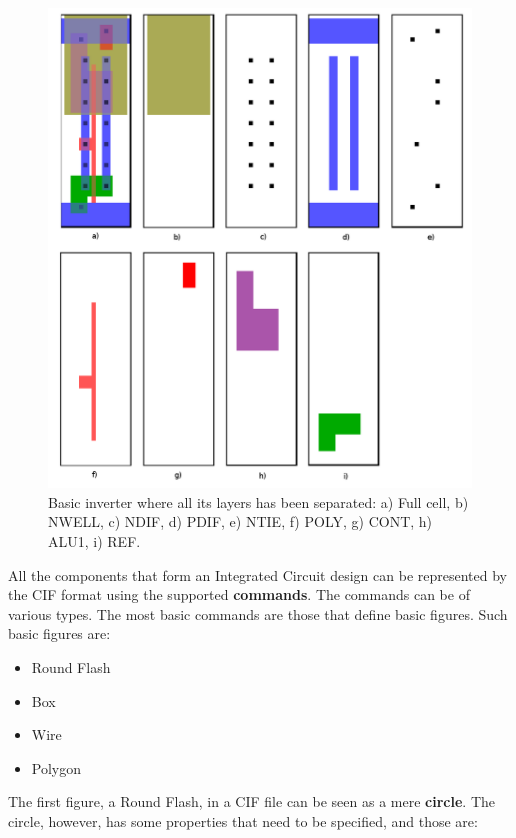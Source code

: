 \documentclass[11pt,twoside,openany,x11names,svgnames]{memoir}
\begin{document}
\begin{figure}
	\centering
	\label{fig:layers}
	\includegraphics[scale=0.35, clip=true, trim= 0pt 0pt 0pt 0pt]{images/chapter02-image01}
	\caption{Basic inverter where all its layers has been separated: a) Full cell, b) NWELL, c) NDIF, d) PDIF, e) NTIE, f) POLY, g) CONT, h) ALU1, i) REF.}
\end{figure}

All the components that form an Integrated Circuit design can be represented by the CIF format using the supported \textbf{commands}. The commands can be of various types. The most basic commands are those that define basic figures. Such basic figures are:

\begin{itemize}
\item Round Flash
\item Box
\item Wire
\item Polygon
\end{itemize}

The first figure, a Round Flash, in a CIF file can be seen as a mere \textbf{circle}. The circle, however, has some properties that need to be specified, and those are:
\end{document}
